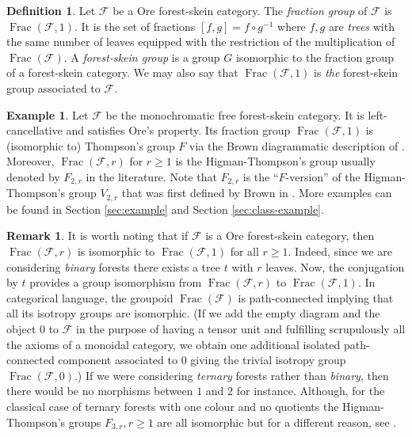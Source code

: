 \documentclass[a4paper, 12pt]{amsart}
\numberwithin{equation}{section}
\theoremstyle{definition}
\newtheorem{definition}[theorem]{Definition}
\newtheorem{remark}[theorem]{Remark}
\newtheorem{example}[theorem]{Example}
\newcommand{\cF}{\mathcal F}
\DeclareMathOperator{\Frac}{Frac}
\begin{document}
\begin{definition}
Let $\cF$ be a Ore forest-skein category.
The \textit{fraction group} of $\cF$ is $\Frac(\cF,1)$.
It is the set of fractions $[f,g]=f\circ g^{-1}$ where $f,g$ are \textit{trees} with the same number of leaves equipped with the restriction of the multiplication of $\Frac(\cF)$.
A {\it forest-skein group} is a group $G$ isomorphic to the fraction group of a forest-skein category. We may also say that $\Frac(\cF,1)$ is {\it the} forest-skein group associated to $\cF$.
\end{definition}

\begin{example}
Let $\cF$ be the monochromatic free forest-skein category.
It is left-cancellative and satisfies Ore's property.
Its fraction group $\Frac(\cF,1)$ is (isomorphic to) Thompson's group $F$ via the Brown diagrammatic description of \cite{Brown87}.
Moreover, $\Frac(\cF,r)$ for $r\geq 1$ is the Higman-Thompson's group usually denoted by $F_{2,r}$ in the literature. Note that $F_{2,r}$ is the ``$F$-version'' of the Higman-Thompson's group $V_{2,r}$ that was first defined by Brown in \cite{Brown87}.
More examples can be found in Section \ref{sec:example} and Section \ref{sec:class-example}.
\end{example}

\begin{remark}
It is worth noting that if $\cF$ is a Ore forest-skein category, then $\Frac(\cF,r)$ is isomorphic to $\Frac(\cF,1)$ for all $r\geq 1$. 
Indeed, since we are considering \textit{binary} forests there exists a tree $t$ with $r$ leaves.
Now, the conjugation by $t$ provides a group isomorphism from $\Frac(\cF,r)$ to $\Frac(\cF,1)$. 
In categorical language, the groupoid $\Frac(\cF)$ is path-connected implying that all its isotropy groups are isomorphic. 
(If we add the empty diagram and the object $0$ to $\cF$ in the purpose of having a tensor unit and fulfilling scrupulously all the axioms of a monoidal category, we obtain one additional isolated path-connected component associated to $0$ giving the trivial isotropy group $\Frac(\cF,0)$.)
If we were considering {\it ternary} forests rather than {\it binary}, then there would be no morphisms between $1$ and $2$ for instance. Although, for the classical case of ternary forests with one colour and no quotients the Higman-Thompson's groups $F_{3,r},r\geq 1$ are all isomorphic but for a different reason, see \cite[Proposition 4.1]{Brown87}.
\end{remark}
\end{document}
